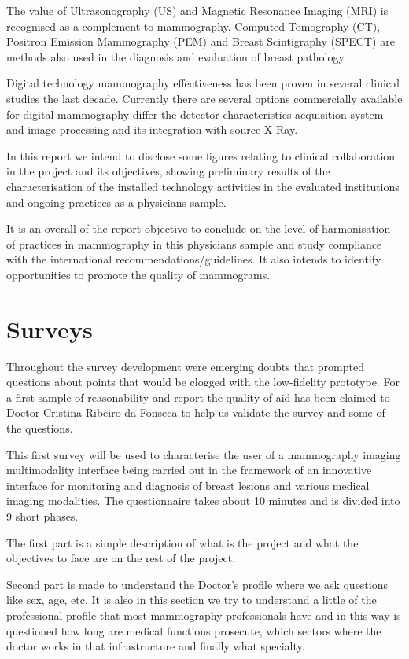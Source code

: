 The value of Ultrasonography (US) and Magnetic Resonance Imaging (MRI) is recognised as a complement to mammography. Computed Tomography (CT), Positron Emission Mammography (PEM) and Breast Scintigraphy (SPECT) are methods also used in the diagnosis and evaluation of breast pathology.

Digital technology mammography effectiveness has been proven in several clinical studies the last decade. Currently there are several options commercially available for digital mammography differ the detector characteristics acquisition system and image processing and its integration with source X-Ray.

In this report we intend to disclose some figures relating to clinical collaboration in the project and its objectives, showing preliminary results of the characterisation of the installed technology activities in the evaluated institutions and ongoing practices as a physicians sample.

It is an overall of the report objective to conclude on the level of harmonisation of practices in mammography in this physicians sample and study compliance with the international recommendations/guidelines. It also intends to identify opportunities to promote the quality of mammograms.

\clearpage

\section{Surveys}

Throughout the survey development were emerging doubts that prompted questions about points that would be clogged with the low-fidelity prototype. For a first sample of reasonability and report the quality of aid has been claimed to Doctor Cristina Ribeiro da Fonseca to help us validate the survey and some of the questions.

This first survey will be used to characterise the user of a mammography imaging multimodality interface being carried out in the framework of an innovative interface for monitoring and diagnosis of breast lesions and various medical imaging modalities. The questionnaire takes about 10 minutes and is divided into 9 short phases.

The first part is a simple description of what is the project and what the objectives to face are on the rest of the project.

Second part is made to understand the Doctor's profile where we ask questions like sex, age, etc. It is also in this section we try to understand a little of the professional profile that most mammography professionals have and in this way is questioned how long are medical functions prosecute, which sectors where the doctor works in that infrastructure and finally what specialty.

